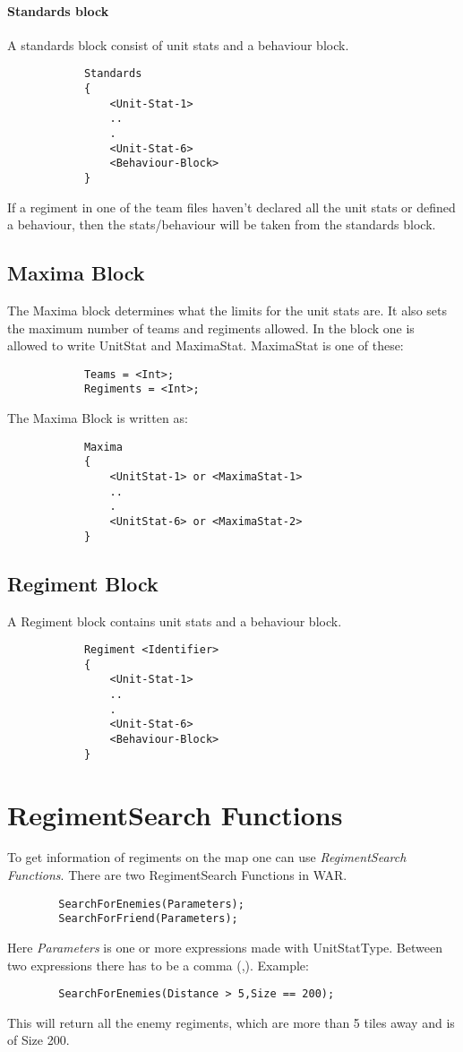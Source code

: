 	\paragraph{Standards block}
		A standards block consist of unit stats and a behaviour block. 
		\begin{verbatim}
			Standards
			{
				<Unit-Stat-1>
				..
				.
				<Unit-Stat-6>
				<Behaviour-Block>
			}
		\end{verbatim}
		If a regiment in one of the team files haven't declared all the unit stats
		or defined a behaviour, then the stats/behaviour will be taken from the standards block.
	\subsection{Maxima Block}
		The Maxima block determines what the limits for the unit stats are. It also sets the maximum number of teams and regiments allowed.
		In the block one is allowed to write UnitStat and MaximaStat.
		MaximaStat is one of these:\\
		\begin{verbatim}
			Teams = <Int>;
			Regiments = <Int>;
		\end{verbatim}
		The Maxima Block is written as: \\
		\begin{verbatim}
			Maxima
			{
				<UnitStat-1> or <MaximaStat-1>
				..
				.
				<UnitStat-6> or <MaximaStat-2>
			}
		\end{verbatim}
	\subsection{Regiment Block}
		A Regiment block contains unit stats and a behaviour block.
		\begin{verbatim}
			Regiment <Identifier>
			{
				<Unit-Stat-1>
				..
				.
				<Unit-Stat-6>
				<Behaviour-Block>
			}
		\end{verbatim}
\section{RegimentSearch Functions}
	To get information of regiments on the map one can use {\it RegimentSearch Functions}. There are two RegimentSearch Functions in WAR.\\
	\begin{verbatim}
		SearchForEnemies(Parameters);
		SearchForFriend(Parameters);
	\end{verbatim}
	Here {\it Parameters} is one or more expressions made with UnitStatType. Between two expressions there has to be a comma (,).
	Example: \\
	\begin{verbatim}
		SearchForEnemies(Distance > 5,Size == 200);
	\end{verbatim}
	This will return all the enemy regiments, which are more than 5 tiles away and is of Size 200.		

